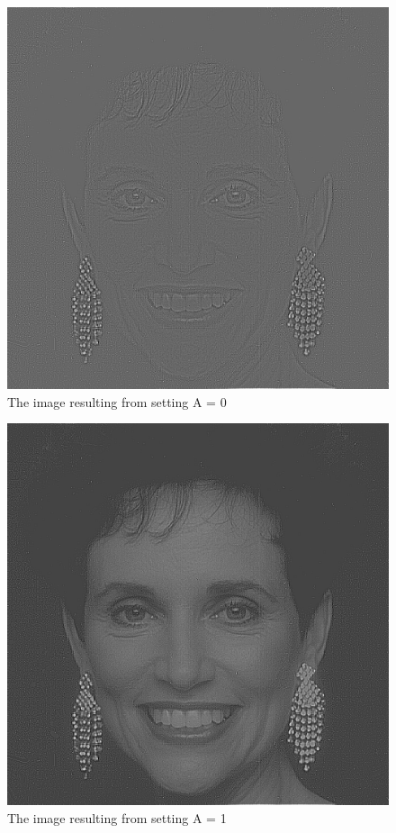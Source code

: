 \documentclass[12pt,letterpaper]{article}
\begin{document}
\begin{figure}[ht]
\centering
\includegraphics[scale=0.135]{woman/ker_a0}
\caption{\small{The image resulting from setting A = 0}
\label{fig:ker_a0} }
\end{figure}
\begin{figure}[ht]
\centering
\includegraphics[scale=0.135]{woman/ker_a1}
\caption{\small{The image resulting from setting A = 1}
\label{fig:ker_a1} }
\end{figure}
\end{document}
